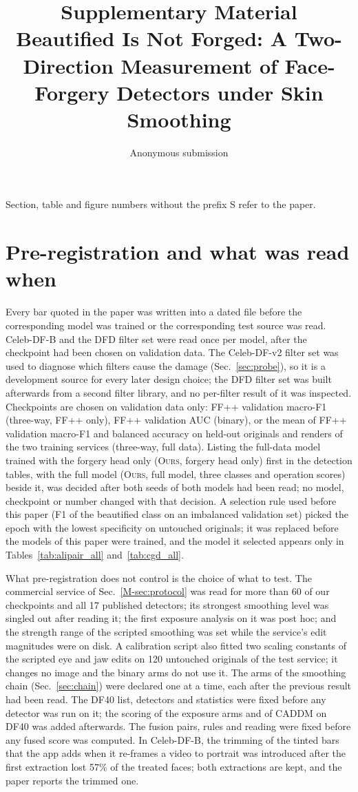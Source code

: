 \documentclass[10pt]{article}
\title{Supplementary Material\\Beautified Is Not Forged: A Two-Direction Measurement of Face-Forgery Detectors under Skin Smoothing}
\author{Anonymous submission}\date{}
\newcommand{\oursB}{\textsc{Ours}, forgery head only}
\newcommand{\oursF}{\textsc{Ours}, full model}
\begin{document}
\maketitle
Section, table and figure numbers without the prefix S refer to the paper.

\section{Pre-registration and what was read when}
\label{sec:prereg}
Every bar quoted in the paper was written into a dated file before the corresponding model was trained or the corresponding test
source was read. Celeb-DF-B and the DFD filter set were read once per model, after the checkpoint had been chosen on validation
data. The Celeb-DF-v2 filter set was used to diagnose which filters cause the damage (Sec.~\ref{sec:probe}), so it is a
development source for every later design choice; the DFD filter set was built afterwards from a second filter library, and no
per-filter result of it was inspected. Checkpoints are chosen on validation data only: FF++ validation macro-F1 (three-way, FF++
only), FF++ validation AUC (binary), or the mean of FF++ validation macro-F1 and balanced accuracy on held-out originals and
renders of the two training services (three-way, full data). Listing the full-data model trained with the forgery head only
(\oursB{}) first in the detection tables, with the full model (\oursF{}, three classes and operation scores) beside it, was
decided after both seeds of both models had been read; no model, checkpoint or number changed with that decision. A selection rule used before this paper (F1 of the beautified class
on an imbalanced validation set) picked the epoch with the lowest specificity on untouched originals; it was replaced before the
models of this paper were trained, and the model it selected appears only in Tables~\ref{tab:alipair_all} and~\ref{tab:cgd_all}.

What pre-registration does not control is the choice of what to test. The commercial service of Sec.~\ref{M-sec:protocol} was
read for more than 60 of our checkpoints and all 17 published detectors; its strongest smoothing level was singled out after
reading it; the first exposure analysis on it was post hoc; and the strength range of the scripted smoothing was set while the
service's edit magnitudes were on disk. A calibration script also fitted two scaling constants of the scripted eye and jaw edits on 120
untouched originals of the test service; it changes no image and the binary arms do not use it. The arms of the smoothing chain (Sec.~\ref{sec:chain}) were declared one at a time, each
after the previous result had been read. The DF40 list, detectors and statistics were fixed before any detector was run on it;
the scoring of the exposure arms and of CADDM on DF40 was added afterwards. The fusion pairs, rules and reading were fixed before
any fused score was computed. In Celeb-DF-B, the trimming of the tinted bars that the app adds when it re-frames a video to
portrait was introduced after the first extraction lost 57\% of the treated faces; both extractions are kept, and the paper
reports the trimmed one.
\end{document}

